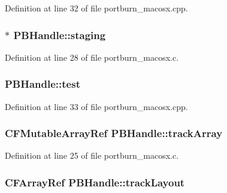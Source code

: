 Definition at line 32 of file portburn\+\_\+macosx.\+cpp.

\subsubsection[{\texorpdfstring{staging}{staging}}]{ $\ast$ P\+B\+Handle\+::staging}\hypertarget{struct_p_b_handle_ad03bd1b9e7af8cc95d28026b4697497d}{}\label{struct_p_b_handle_ad03bd1b9e7af8cc95d28026b4697497d}


Definition at line 28 of file portburn\+\_\+macosx.\+c.

\subsubsection[{\texorpdfstring{test}{test}}]{ P\+B\+Handle\+::test}\hypertarget{struct_p_b_handle_a5efb27a01890a9cc8c009e1fa3bacd78}{}\label{struct_p_b_handle_a5efb27a01890a9cc8c009e1fa3bacd78}


Definition at line 33 of file portburn\+\_\+macosx.\+cpp.

\subsubsection[{\texorpdfstring{track\+Array}{trackArray}}]{\setlength{\rightskip}{0pt plus 5cm}C\+F\+Mutable\+Array\+Ref P\+B\+Handle\+::track\+Array}\hypertarget{struct_p_b_handle_a24b93dede18d46cfc6db8d2669126ba4}{}\label{struct_p_b_handle_a24b93dede18d46cfc6db8d2669126ba4}


Definition at line 25 of file portburn\+\_\+macosx.\+c.

\subsubsection[{\texorpdfstring{track\+Layout}{trackLayout}}]{\setlength{\rightskip}{0pt plus 5cm}C\+F\+Array\+Ref P\+B\+Handle\+::track\+Layout}\hypertarget{struct_p_b_handle_a1fc12fc6d9de5089916397f33e843090}{}\label{struct_p_b_handle_a1fc12fc6d9de5089916397f33e843090}


